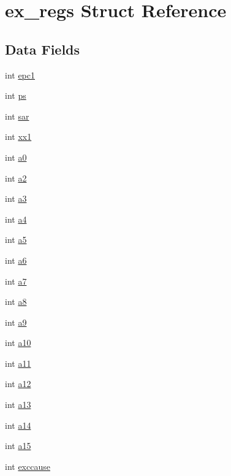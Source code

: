 \hypertarget{structex__regs}{\section{ex\-\_\-regs Struct Reference}
\label{structex__regs}
}
\subsection*{Data Fields}
\begin{DoxyCompactItemize}
\item 
int \hyperlink{structex__regs_a907bf7dfc14dd0b4f3c1e35416551590}{epc1}
\item 
int \hyperlink{structex__regs_a41791a7ade763f5f965ca2d412914dbb}{ps}
\item 
int \hyperlink{structex__regs_a8fd11e49ee65ba875a04ab28789cf702}{sar}
\item 
int \hyperlink{structex__regs_a12379b0b3152b878eebc8f18a6efeaf0}{xx1}
\item 
int \hyperlink{structex__regs_ab9e470c41e6c89050e83f07ba3d020a6}{a0}
\item 
int \hyperlink{structex__regs_a26e59e49025e70d6d9aaaf96a3f4df53}{a2}
\item 
int \hyperlink{structex__regs_ab71b2779966288ee152a7b7ca30241f2}{a3}
\item 
int \hyperlink{structex__regs_aa2b0ed69fb75ee2b8384b5b975737c64}{a4}
\item 
int \hyperlink{structex__regs_a8d6ecd5647dd5921c86b70c3db095d15}{a5}
\item 
int \hyperlink{structex__regs_a23fa5fa94f11950e7320393beb830618}{a6}
\item 
int \hyperlink{structex__regs_a73f04b635c3699e9b83fadeacdb1eda2}{a7}
\item 
int \hyperlink{structex__regs_a4a700b056da9b3ea0917603b9c4f9b28}{a8}
\item 
int \hyperlink{structex__regs_a513f72e66ad69090bdbb06fb37f177d1}{a9}
\item 
int \hyperlink{structex__regs_af85ef649abe139889371e7bbecad73ad}{a10}
\item 
int \hyperlink{structex__regs_a94aedd1e40a7f814340b845ba35c6b62}{a11}
\item 
int \hyperlink{structex__regs_a3375d9f2f78cce316b6d6a7ddb4e55c4}{a12}
\item 
int \hyperlink{structex__regs_a6d85cce0da676baba0080cb22ca81ee2}{a13}
\item 
int \hyperlink{structex__regs_aec55873d79a2b12fb9c74e4db8071477}{a14}
\item 
int \hyperlink{structex__regs_ab9f5db40e8ea16e1c55093a7ef374342}{a15}
\item 
int \hyperlink{structex__regs_a001bdc446169cb523be54cf5deeb8dd6}{exccause}
\end{DoxyCompactItemize}


